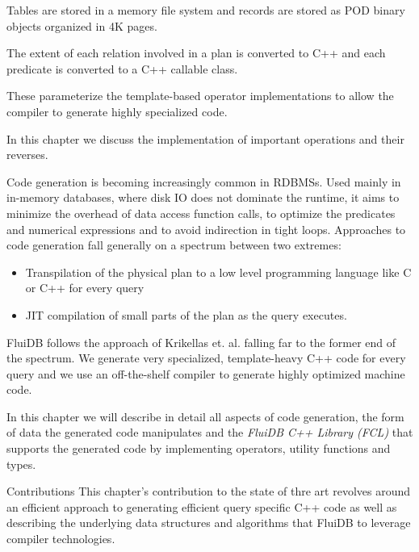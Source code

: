 
\begin{summary}
\item Tables are stored in a memory file system and records are
  stored as POD binary objects organized in 4K pages.
\item The extent of each relation involved in a plan is converted to
  C++  and each predicate is converted to a C++ callable
  class.
\item These parameterize the template-based operator implementations to allow the
  compiler to generate highly specialized code.
\item In this chapter we discuss the implementation of important
  operations and their reverses.
\end{summary}

Code generation is becoming increasingly common in RDBMSs. Used
mainly in in-memory databases, where disk IO does not dominate the
runtime, it aims to minimize the overhead of data access function
calls, to optimize the predicates and numerical expressions and to
avoid indirection in tight loops. Approaches to code generation fall
generally on a spectrum between two extremes:

\begin{itemize}
\item Transpilation of the physical plan to a low level programming
  language like C or C++ for every query
\item JIT compilation of small parts of the plan as the query
  executes.
\end{itemize}

FluiDB follows the approach of Krikellas
et. al. \cite{krikellasGeneratingCodeHolistic2010} falling far to the
former end of the spectrum. We generate very specialized,
template-heavy C++ code for every query and we use an off-the-shelf
compiler to generate highly optimized machine code.

In this chapter we will describe in detail all aspects of code
generation, the form of data the generated code manipulates and the
\emph{FluiDB C++ Library (FCL)} that supports the generated code by
implementing operators, utility functions and types.

\begin{corrected}{Contributions}
  This chapter's contribution to the state of thre art revolves around
  an efficient approach to generating efficient query specific C++
  code as well as describing the underlying data structures and
  algorithms that FluiDB to leverage compiler technologies.
\end{corrected}


